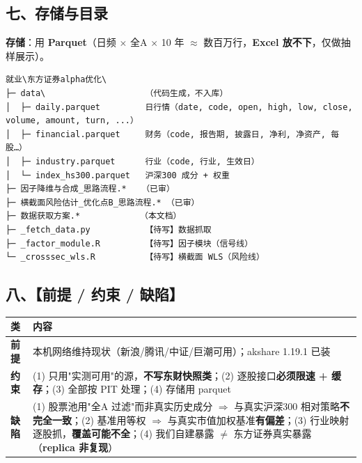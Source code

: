 \documentclass[11pt]{article}
\begin{document}
\subsection{\texorpdfstring{七、存储与目录}{七、存储与目录}}
\textbf{存储}：用 \textbf{Parquet}（日频 \ensuremath{\times} 全A \ensuremath{\times} 10 年 \ensuremath{\approx} 数百万行，\textbf{Excel 放不下}，仅做抽样展示）。
\begin{verbatim}
就业\东方证券alpha优化\
├─ data\                    （代码生成，不入库）
│  ├─ daily.parquet         日行情（date, code, open, high, low, close, volume, amount, turn, ...）
│  ├─ financial.parquet     财务（code, 报告期, 披露日, 净利, 净资产, 每股…）
│  ├─ industry.parquet      行业（code, 行业, 生效日）
│  └─ index_hs300.parquet   沪深300 成分 + 权重
├─ 因子降维与合成_思路流程.*   （已审）
├─ 横截面风险估计_优化点B_思路流程.* （已审）
├─ 数据获取方案.*            （本文档）
├─ _fetch_data.py           【待写】数据抓取
├─ _factor_module.R         【待写】因子模块（信号线）
└─ _crosssec_wls.R          【待写】横截面 WLS（风险线）
\end{verbatim}
\subsection{\texorpdfstring{八、【前提 / 约束 / 缺陷】}{八、【前提 / 约束 / 缺陷】}}
{\small
\begin{longtable}{p{1.24cm}p{14.96cm}}
\toprule
类 & 内容 \\
\midrule
\textbf{前提} & 本机网络维持现状（新浪/腾讯/中证/巨潮可用）；akshare 1.19.1 已装 \\
\textbf{约束} & (1) 只用"实测可用"的源，\textbf{不写东财快照类}；(2) 逐股接口\textbf{必须限速 + 缓存}；(3) 全部按 PIT 处理；(4) 存储用 parquet \\
\textbf{缺陷} & (1) 股票池用"全A 过滤"而非真实历史成分 \ensuremath{\Longrightarrow} 与真实沪深300 相对策略\textbf{不完全一致}；(2) 基准用等权 \ensuremath{\Longrightarrow} 与真实市值加权基准\textbf{有偏差}；(3) 行业映射逐股抓，\textbf{覆盖可能不全}；(4) 我们自建暴露 \ensuremath{\ne} 东方证券真实暴露（\textbf{replica 非复现}） \\
\bottomrule
\end{longtable}
}
\end{document}
